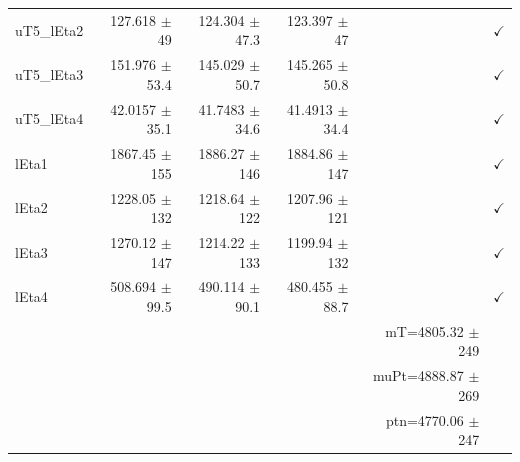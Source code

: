 \begin{table}[htbp]
\begin{tabular}{lrrrrr}
uT5\_lEta2 & 127.618 $\pm$ 49 & 124.304 $\pm$ 47.3 & 123.397 $\pm$ 47 &  & $\checkmark$ \\
uT5\_lEta3 & 151.976 $\pm$ 53.4 & 145.029 $\pm$ 50.7 & 145.265 $\pm$ 50.8 &  & $\checkmark$ \\
uT5\_lEta4 & 42.0157 $\pm$ 35.1 & 41.7483 $\pm$ 34.6 & 41.4913 $\pm$ 34.4 &  & $\checkmark$ \\
\hline
lEta1 & 1867.45 $\pm$ 155 & 1886.27 $\pm$ 146 & 1884.86 $\pm$ 147 &  & $\checkmark$ \\
lEta2 & 1228.05 $\pm$ 132 & 1218.64 $\pm$ 122 & 1207.96 $\pm$ 121 &  & $\checkmark$ \\
lEta3 & 1270.12 $\pm$ 147 & 1214.22 $\pm$ 133 & 1199.94 $\pm$ 132 &  & $\checkmark$ \\
lEta4 & 508.694 $\pm$ 99.5 & 490.114 $\pm$ 90.1 & 480.455 $\pm$ 88.7 &  & $\checkmark$ \\
\hline
 &  &  &  & mT=4805.32 $\pm$ 249 &  \\
 &  &  &  & muPt=4888.87 $\pm$ 269 &  \\
 &  &  &  & ptn=4770.06 $\pm$ 247 &  \\
\hline
\end{tabular}
\end{table}
